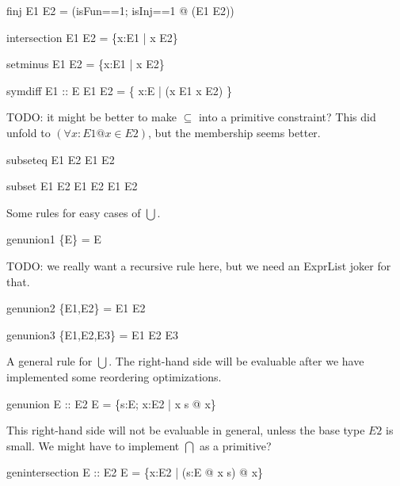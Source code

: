\documentclass{article}
\begin{document}
\begin{zedrule}{finj}
   E1 \finj E2 = (\LET isFun==1; isInj==1 @ \power (E1 \cross E2))
\end{zedrule}



\begin{zedrule}{intersection}
   E1 \cap E2 = \{x:E1 | x \in E2\}
\end{zedrule}

\begin{zedrule}{setminus}
   E1 \setminus E2 = \{x:E1 | x \notin E2\}
\end{zedrule}

\begin{zedrule}{symdiff}
  E1 :: \power E
\derives
   E1 \symdiff E2 = \{ x:E | \lnot (x \in E1 \iff x \in E2) \}
\end{zedrule}

TODO: it might be better to make $\subseteq$ into a primitive constraint?
This did unfold to  $(\forall x:E1 @ x \in E2)$, but the membership seems
better.

\begin{zedrule}{subseteq}
   E1 \subseteq E2 \iff E1 \in \power E2
\end{zedrule}

\begin{zedrule}{subset}
   E1 \subset E2 \iff E1 \subseteq E2 \land E1 \neq E2
\end{zedrule}

Some rules for easy cases of $\bigcup$.
\begin{zedrule}{genunion1}
   \bigcup \{E\} = E
\end{zedrule}

TODO: we really want a recursive rule here,
but we need an ExprList joker for that.
\begin{zedrule}{genunion2}
   \bigcup \{E1,E2\} = E1 \cup E2
\end{zedrule}
\begin{zedrule}{genunion3}
   \bigcup \{E1,E2,E3\} = E1 \cup E2 \cup E3
\end{zedrule}

A general rule for $\bigcup$.
The right-hand side will be evaluable after we have implemented
some reordering optimizations. 
\begin{zedrule}{genunion}
   E :: \power \power E2
\derives
   \bigcup E = \{s:E; x:E2 | x \in s @ x\}
\end{zedrule}

This right-hand side will not be evaluable in general,
unless the base type $E2$ is small.  We might have to
implement $\bigcap$ as a primitive?
\begin{zedrule}{genintersection}
   E :: \power \power E2
\derives
   \bigcap E = \{x:E2 | (\forall s:E @ x \in s) @ x\}
\end{zedrule}
\end{document}
